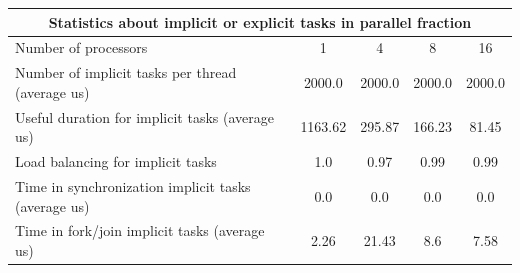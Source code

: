 \begin{tabular}{|l|c|c|c|c|}
\hline
\multicolumn{5}{|c|}{Statistics about implicit or explicit tasks in parallel fraction} \\
\hline
\hline
Number of processors & 1 & 4 & 8 & 16 \\
\hline
\hline
Number of implicit tasks per thread (average us)    &          2000.0 &          2000.0 &          2000.0 &          2000.0 \\
\hline
Useful duration for implicit tasks (average us)     &         1163.62 &          295.87 &          166.23 &           81.45 \\
\hline
Load balancing for implicit tasks                &             1.0 &            0.97 &            0.99 &            0.99 \\
\hline
Time in synchronization implicit tasks (average us) &             0.0 &             0.0 &             0.0 &             0.0 \\
\hline
Time in fork/join implicit tasks (average us)       &            2.26 &           21.43 &             8.6 &            7.58 \\
\hline
\end{tabular}
